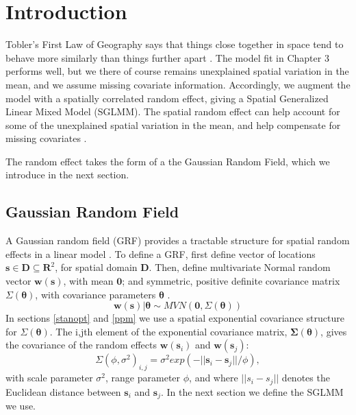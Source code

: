 
\section{Introduction} %

Tobler's First Law of Geography says that things close together in space tend to behave more similarly than things further apart \citep{Tobler1970}. The model fit in Chapter 3 performs well, but we there of course remains unexplained spatial variation in the mean, and we assume missing covariate information. Accordingly, we augment the model with a spatially correlated random effect, giving a Spatial Generalized Linear Mixed Model (SGLMM). The spatial random effect can help account for some of the unexplained spatial variation in the mean, and help compensate for missing covariates \citep{Banerjee2008}. 

The random effect takes the form of a the Gaussian Random Field, which we introduce in the next section.

\subsection{Gaussian Random Field} %

A Gaussian random field (GRF) provides a tractable structure for spatial random effects in a linear model \citep{Gelfand2010}. To define a GRF, first define vector of locations $\pmb{s} \in \pmb{D} \subseteq \pmb{R}^{2}$, for spatial domain $\pmb{D}$. Then, define multivariate Normal random vector $\pmb{w}(\pmb{s})$, with mean $\pmb{0}$; and symmetric, positive definite covariance matrix $\Sigma(\pmb{\theta})$, with covariance parameters $\pmb{\theta}$ \citep{Haran2011}.
\begin{equation} \label{eq:w}
\pmb{w}(\pmb{s}) | \pmb{\theta} \sim MVN(\pmb{0}, \Sigma(\pmb{\theta})) 
\end{equation}
In sections \ref{stanopt} and \ref{ppm} we use a spatial exponential covariance structure for $\Sigma(\pmb{\theta})$. The i,jth element of the exponential covariance matrix, $\pmb{\Sigma}(\pmb{\theta})$, gives the covariance of the random effects $\pmb{w}(\pmb{s}_{i})$ and $\pmb{w}(\pmb{s}_{j})$:
\begin{equation} \label{eq:exp}
\Sigma(\phi, \sigma^{2})_{i,j} = \sigma^{2} exp(-||\pmb{s}_{i} - \pmb{s}_{j}||/\phi),
\end{equation}
with scale parameter $\sigma^{2}$, range parameter $\phi$, and where $||s_{i} - s_{j}||$ denotes the Euclidean distance between $\pmb{s}_{i}$ and $\pmb{s}_{j}$. In the next section we define the SGLMM we use.

